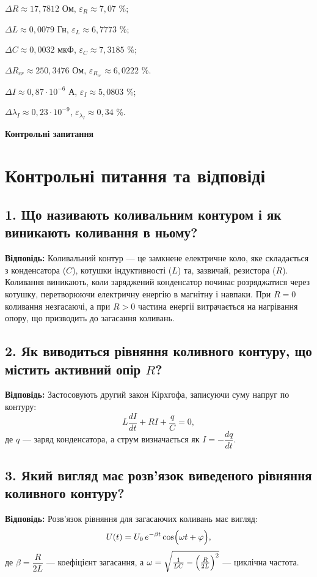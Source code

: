 \documentclass[12pt,a4paper]{article}
\begin{document}
    $\Delta R \approx 17,7812$ Ом, $\varepsilon_R \approx 7,07$ \%;

    $\Delta L \approx 0,0079$ Гн, $\varepsilon_L \approx 6,7773$ \%;

    $\Delta C \approx 0,0032$ мкФ, $\varepsilon_C \approx 7,3185$ \%;

    $\Delta R_{cr} \approx 250,3476$ Ом, $\varepsilon_{R_{cr}} \approx 6,0222$ \%.

    $\Delta I \approx 0,87 \cdot 10^{-6}$ А, $\varepsilon_I \approx 5,0803$ \%;

    $\Delta \lambda_I \approx 0,23 \cdot 10^{-9}$, $\varepsilon_{\lambda_I} \approx 0,34$ \%.

    \vspace{3em}

    \newpage

    \begin{center}
        \textbf{\Large Контрольні запитання}
    \end{center}

    \section*{Контрольні питання та відповіді}

    \subsection*{1. Що називають коливальним контуром і як виникають коливання в ньому?}
    \textbf{Відповідь:}  
    Коливальний контур --- це замкнене електричне коло, яке складається з конденсатора ($C$), котушки індуктивності ($L$) та, зазвичай, резистора ($R$). Коливання виникають, коли заряджений конденсатор починає розряджатися через котушку, перетворюючи електричну енергію в магнітну і навпаки. При $R=0$ коливання незгасаючі, а при $R>0$ частина енергії витрачається на нагрівання опору, що призводить до загасання коливань.

    \subsection*{2. Як виводиться рівняння коливного контуру, що містить активний опір $R$?}
    \textbf{Відповідь:}  
    Застосовують другий закон Кірхгофа, записуючи суму напруг по контуру:
    \[
    L\frac{dI}{dt} + RI + \frac{q}{C} = 0,
    \]
    де $q$ --- заряд конденсатора, а струм визначається як $I=-\dfrac{dq}{dt}$.

    \subsection*{3. Який вигляд має розв'язок виведеного рівняння коливного контуру?}
    \textbf{Відповідь:}  
    Розв’язок рівняння для загасаючих коливань має вигляд:
    \[
    U(t)=U_0\, e^{-\beta t}\cos\Bigl(\omega t+\varphi\Bigr),
    \]
    де \(\beta=\dfrac{R}{2L}\) --- коефіцієнт загасання, а \(\omega=\sqrt{\frac{1}{LC}-\Bigl(\frac{R}{2L}\Bigr)^2}\) --- циклічна частота.
\end{document}
